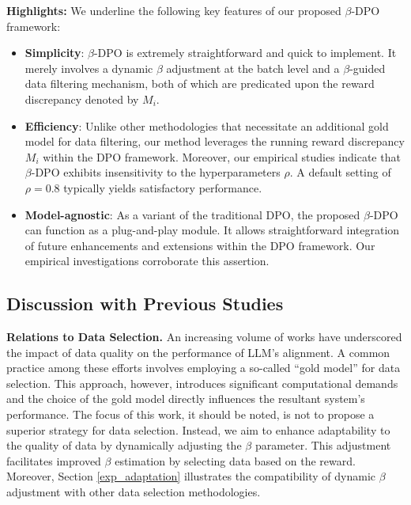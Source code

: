 \textbf{Highlights:}
We underline the following key features of our proposed $\beta$-DPO framework:
\begin{itemize}[leftmargin=*]
    \item \textbf{Simplicity}: $\beta$-DPO is extremely straightforward and quick to implement. It merely involves a dynamic $\beta$ adjustment at the batch level and a $\beta$-guided data filtering mechanism, both of which are predicated upon the reward discrepancy denoted by $M_i$.
    \item \textbf{Efficiency}: Unlike other methodologies \cite{RSO,morimura2024filtered,pruthi2020estimating,f-dpo} that necessitate an additional gold model for data filtering, our method leverages the running reward discrepancy $M_i$ within the DPO framework. Moreover, our empirical studies indicate that $\beta$-DPO exhibits insensitivity to the hyperparameters $\rho$. A default setting of $\rho=0.8$ typically yields satisfactory performance.
    \item \textbf{Model-agnostic}: As a variant of the traditional DPO, the proposed $\beta$-DPO can function as a plug-and-play module. It allows straightforward integration of future enhancements and extensions within the DPO framework. Our empirical investigations corroborate this assertion.
\end{itemize}

\subsection{Discussion with Previous Studies}
\textbf{Relations to Data Selection.} An increasing volume of works \cite{RSO,morimura2024filtered,LIMA,pruthi2020estimating, xia2024less} have underscored the impact of data quality on the performance of LLM's alignment. A common practice among these efforts involves employing a so-called ``gold model'' for data selection. This approach, however, introduces significant computational demands and the choice of the gold model directly influences the resultant system's performance. The focus of this work, it should be noted, is not to propose a superior strategy for data selection. Instead, we aim to enhance adaptability to the quality of data by dynamically adjusting the $\beta$ parameter. This adjustment facilitates improved $\beta$ estimation by selecting data based on the reward. Moreover, Section \ref{exp_adaptation} illustrates the compatibility of dynamic $\beta$ adjustment with other data selection methodologies.

